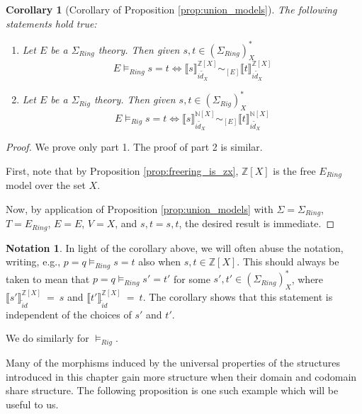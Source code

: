 \documentclass{msthesis}
\newtheorem{corollary}[theorem]{Corollary}
\theoremstyle{definition}
\newtheorem*{notation}{Notation}
\newcommand{\semof}[1]{\llbracket{#1}\rrbracket}
\newcommand{\ints}{\mathbb{Z}}
\newcommand{\nat}{\mathbb{N}}
\begin{document}
\begin{corollary}[Corollary of Proposition \ref{prop:union_models}]
\label{cor:rigmodels}
The following statements hold true:
    \begin{enumerate}[nosep]
        \item Let $E$ be a $\Sigma_{Ring}$ theory.  Then given $s, t \in (\Sigma_{Ring})^*_X$
            \[ E \models_{Ring} s = t \iff \semof{s}_{\tilde{id_X}}^{\ints[X]} \sim_{[E]} \semof{t}_{\tilde{id_X}}^{\ints[X]} \]
        \item Let $E$ be a $\Sigma_{Rig}$ theory.  Then given $s, t \in (\Sigma_{Rig})^*_X$
            \[ E \models_{Rig} s = t \iff \semof{s}_{\tilde{id_X}}^{\nat[X]} \sim_{[E]} \semof{t}_{\tilde{id_X}}^{\nat[X]}\]
    \end{enumerate}
\end{corollary}

\begin{proof}
We prove only part 1. The proof of part 2 is similar.

First, note that by Proposition \ref{prop:freering_is_zx}, $\ints[X]$ is the free $E_{Ring}$ model over the set $X$.

Now, by application of Proposition \ref{prop:union_models} with $\Sigma = \Sigma_{Ring}$, $T = E_{Ring}$, $E = E$, $V = X$, and $s, t = s, t$, the desired result is immediate.
\end{proof}

\begin{notation}
In light of the corollary above, we will often abuse the notation, writing, e.g., $p = q \models_{Ring} s = t$ also when $s, t \in \ints[X]$.
This should always be taken to mean that $p = q \models_{Ring} s' = t'$ for some $s', t' \in (\Sigma_{Ring})^*_X$, where $\semof{s'}^{\ints[X]}_{\tilde id}~=~s$ and $\semof{t'}^{\ints[X]}_{\tilde id}~=~t$.  
The corollary shows that this statement is independent of the choices of $s'$ and $t'$.

We do similarly for $\models_{Rig}$.
\end{notation}


Many of the morphisms induced by the universal properties of the structures introduced in this chapter gain more structure when their domain and codomain share structure.  The following proposition is one such example which will be useful to us.
\end{document}
